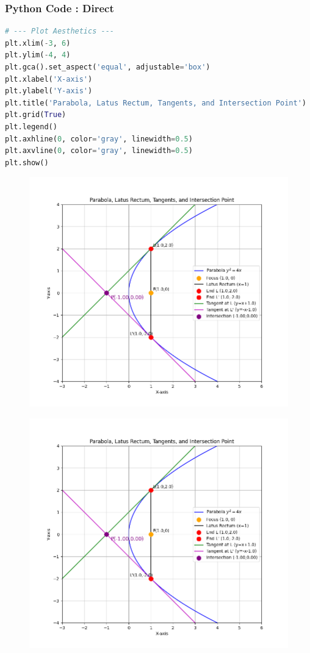 \documentclass{beamer}
\begin{document}
\begin{frame}[fragile]
\frametitle{Python Code : Direct}
\begin{lstlisting}[language=Python]
# --- Plot Aesthetics ---
plt.xlim(-3, 6)
plt.ylim(-4, 4)
plt.gca().set_aspect('equal', adjustable='box')
plt.xlabel('X-axis')
plt.ylabel('Y-axis')
plt.title('Parabola, Latus Rectum, Tangents, and Intersection Point')
plt.grid(True)
plt.legend()
plt.axhline(0, color='gray', linewidth=0.5)
plt.axvline(0, color='gray', linewidth=0.5)
plt.show()
\end{lstlisting}
\end{frame}

\begin{frame}
\begin{figure}[H]
\centering
\includegraphics[width=0.8\columnwidth]{../figs/mat181.png}
\caption{}
\label{fig:1}
\end{figure}
\end{frame}

\begin{frame}
\begin{figure}[H]
\centering
\includegraphics[width=0.7\columnwidth]{../figs/mat181.png}
\caption{}
\label{fig:2}
\end{figure}
\end{frame}
\end{document}
